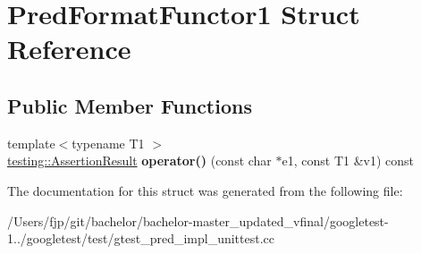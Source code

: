 \hypertarget{struct_pred_format_functor1}{}\section{Pred\+Format\+Functor1 Struct Reference}
\label{struct_pred_format_functor1}
\subsection*{Public Member Functions}
\begin{DoxyCompactItemize}
\item 
\mbox{\label{struct_pred_format_functor1_ac2c414b5fa65b41b0ab5967f9f1e5bff}} 
{\footnotesize template$<$typename T1 $>$ }\\\mbox{\hyperlink{classtesting_1_1_assertion_result}{testing\+::\+Assertion\+Result}} {\bfseries operator()} (const char $\ast$e1, const T1 \&v1) const
\end{DoxyCompactItemize}


The documentation for this struct was generated from the following file\+:\begin{DoxyCompactItemize}
\item 
/\+Users/fjp/git/bachelor/bachelor-\/master\+\_\+updated\+\_\+vfinal/googletest-\/1../googletest/test/gtest\+\_\+pred\+\_\+impl\+\_\+unittest.\+cc\end{DoxyCompactItemize}
